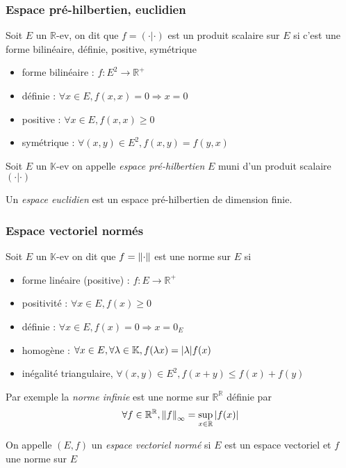 \documentclass[11pt,colorlinks]{book}
\theoremstyle{mytheoremstyle}
\theoremstyle{mytheoremstyle}
\theoremstyle{mytheoremstyle}
\theoremstyle{mytheoremstyle}
\theoremstyle{mytheoremstyle}
\theoremstyle{mytheoremstyle}
\theoremstyle{mytheoremstyle}
\theoremstyle{mytheoremstyle}
\theoremstyle{myproblemstyle}
\def\mbb#1{\mathbb{#1}}
\def\bR{\mbb{R}}
\def\bK{\mbb{K}}
\begin{document}
\subsubsection{Espace pré-hilbertien, euclidien}
\begin{definition}
  Soit $E$ un $\bR$-ev, on dit que $f = (\cdot | \cdot)$ est un produit scalaire sur $E$ si c'est une forme bilinéaire, définie, positive, symétrique
  \begin{itemize}
    \item forme bilinéaire : $f : E^2 \to \bR^+$ 
    \item définie : $\forall x \in E, f(x,x) = 0 \Rightarrow x=0$
    \item positive : $\forall x \in E, f(x,x) \geq 0$ 
    \item symétrique : $\forall (x,y) \in E^2, f(x,y) = f(y,x)$
  \end{itemize}
\end{definition}
\begin{definition}
  Soit $E$ un $\bK$-ev on appelle \textit{espace pré-hilbertien} $E$ muni d'un produit scalaire $(\cdot | \cdot)$
\end{definition}
\begin{definition}
  Un \textit{espace euclidien} est un espace pré-hilbertien de dimension finie.
\end{definition}
\subsubsection{Espace vectoriel normés}
\begin{definition}
  Soit $E$ un $\bK$-ev on dit que $f = \norm{\cdot}$ est une norme sur $E$ si 
  \begin{itemize}
    \item forme linéaire (positive) : $f : E \to \bR^+$
    \item positivité : $\forall x \in E, f(x) \geq 0$ 
    \item définie : $\forall x \in E, f(x)=0 \Rightarrow x=0_E$
    \item homogène : $\forall x \in E, \forall \lambda \in \bK, f(\lambda x) = \abs{\lambda} f(x)$
    \item inégalité triangulaire, $\forall (x,y) \in E^2, f(x+y) \leq f(x) + f(y)$
  \end{itemize}
\end{definition}
\begin{ex}
  Par exemple la \textit{norme infinie} est une norme sur $\bR^{\bR}$ définie par 
  \begin{equation*}
    \forall f \in \bR^{\bR}, \norm{f}_{\infty} = \sup_{x \in \bR} \abs{f(x)}
  \end{equation*}
\end{ex}
\begin{definition}
  On appelle $(E,f)$ un \textit{espace vectoriel normé} si $E$ est un espace vectoriel et $f$ une norme sur $E$
\end{definition}
\end{document}
